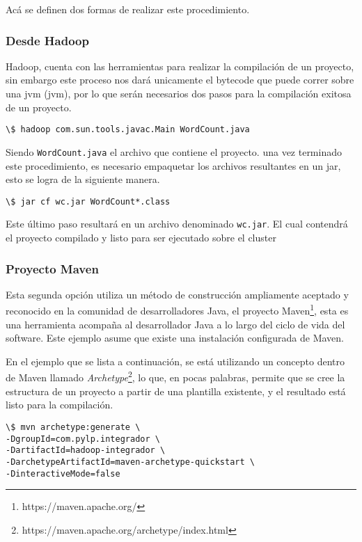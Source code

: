 Acá se definen dos formas de realizar este procedimiento.

\subsubsection*{Desde Hadoop}
Hadoop, cuenta con las herramientas para realizar la compilación de un
proyecto, sin embargo este proceso nos dará unicamente el bytecode que puede
correr sobre una \acrlong{jvm} (\acrshort{jvm}), por lo que serán necesarios
dos pasos para la compilación exitosa de un proyecto.

\begin{verbatim}
\$ hadoop com.sun.tools.javac.Main WordCount.java
\end{verbatim}

Siendo {\tt WordCount.java} el archivo que contiene el proyecto. una vez
terminado este procedimiento, es necesario empaquetar los archivos resultantes
en un \acrshort{jar}, esto se logra de la siguiente manera.

\begin{verbatim}
\$ jar cf wc.jar WordCount*.class 
\end{verbatim}

Este último paso resultará en un archivo denominado {\tt wc.jar}. El cual
contendrá el proyecto compilado y listo para ser ejecutado sobre el
\gls{cluster}

\subsubsection*{Proyecto Maven}
Esta segunda opción utiliza un método de construcción ampliamente aceptado y
reconocido en la comunidad de desarrolladores Java, el proyecto 
Maven\footnote{https://maven.apache.org/}, esta es una herramienta acompaña al 
desarrollador Java a lo largo del ciclo de vida del software. Este ejemplo
asume que existe una instalación configurada de Maven.

En el ejemplo que se lista a continuación, se está utilizando un concepto dentro
de Maven llamado
{\it Archetype}\footnote{https://maven.apache.org/archetype/index.html}, lo
que, en pocas palabras, permite que se cree la estructura de un proyecto a partir de
una plantilla existente, y el resultado está listo para la compilación.

\begin{verbatim}
\$ mvn archetype:generate \
-DgroupId=com.pylp.integrador \
-DartifactId=hadoop-integrador \
-DarchetypeArtifactId=maven-archetype-quickstart \
-DinteractiveMode=false
\end{verbatim}

